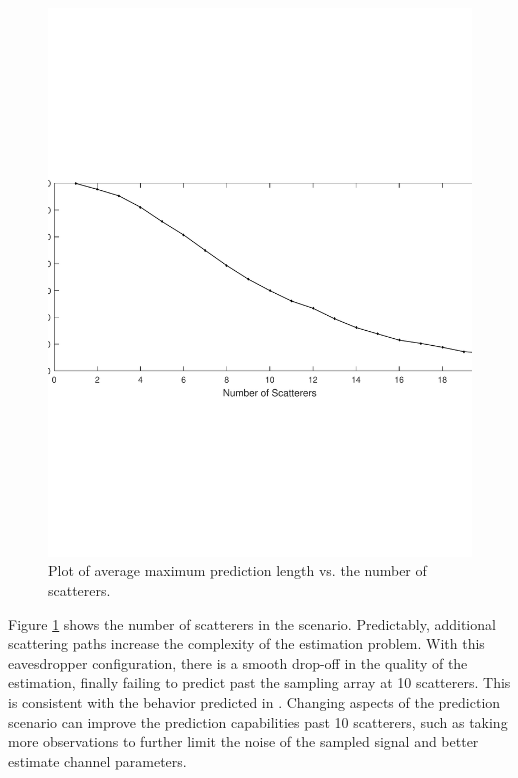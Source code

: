 \documentclass{allertonproc}
\begin{document}
\begin{figure}[tbp]
\begin{center}
\includegraphics[width=6in]{numScatterers}
\caption{Plot of average maximum prediction length vs. the number of scatterers.}\label{Scatter}
\end{center}
\end{figure}
Figure \ref{Scatter} shows the number of scatterers in the scenario. Predictably, additional scattering paths increase the complexity of the estimation problem. With this eavesdropper configuration, there is a smooth drop-off in the quality of the estimation, finally failing to predict past the sampling array at 10 scatterers. This is consistent with the behavior predicted in \cite{kckpVTC2015}. Changing aspects of the prediction scenario can improve the prediction capabilities past 10 scatterers, such as taking more observations to further limit the noise of the sampled signal and better estimate channel parameters. 
\end{document}
